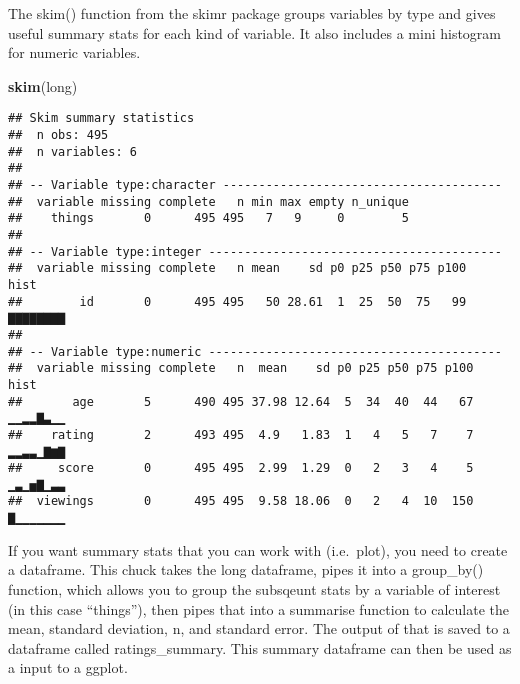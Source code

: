 \documentclass[]{article}
\newenvironment{Shaded}{\begin{snugshade}}{\end{snugshade}}
\newcommand{\DataTypeTok}[1]{\textcolor[rgb]{0.13,0.29,0.53}{#1}}
\newcommand{\KeywordTok}[1]{\textcolor[rgb]{0.13,0.29,0.53}{\textbf{#1}}}
\newcommand{\NormalTok}[1]{#1}
\newcommand{\OperatorTok}[1]{\textcolor[rgb]{0.81,0.36,0.00}{\textbf{#1}}}
\newcommand{\OtherTok}[1]{\textcolor[rgb]{0.56,0.35,0.01}{#1}}
\newcommand{\StringTok}[1]{\textcolor[rgb]{0.31,0.60,0.02}{#1}}
\begin{document}
The skim() function from the skimr package groups variables by type and
gives useful summary stats for each kind of variable. It also includes a
mini histogram for numeric variables.

\begin{Shaded}
\begin{Highlighting}[]
\KeywordTok{skim}\NormalTok{(long) }
\end{Highlighting}
\end{Shaded}

\begin{verbatim}
## Skim summary statistics
##  n obs: 495 
##  n variables: 6 
## 
## -- Variable type:character ---------------------------------------
##  variable missing complete   n min max empty n_unique
##    things       0      495 495   7   9     0        5
## 
## -- Variable type:integer -----------------------------------------
##  variable missing complete   n mean    sd p0 p25 p50 p75 p100     hist
##        id       0      495 495   50 28.61  1  25  50  75   99 ▇▇▇▇▇▇▇▇
## 
## -- Variable type:numeric -----------------------------------------
##  variable missing complete   n  mean    sd p0 p25 p50 p75 p100     hist
##       age       5      490 495 37.98 12.64  5  34  40  44   67 ▁▁▂▂▇▃▁▁
##    rating       2      493 495  4.9   1.83  1   4   5   7    7 ▂▂▃▃▁▇▆▇
##     score       0      495 495  2.99  1.29  0   2   3   4    5 ▁▃▁▅▇▁▃▃
##  viewings       0      495 495  9.58 18.06  0   2   4  10  150 ▇▁▁▁▁▁▁▁
\end{verbatim}

If you want summary stats that you can work with (i.e.~plot), you need
to create a dataframe. This chuck takes the long dataframe, pipes it
into a group\_by() function, which allows you to group the subsqeunt
stats by a variable of interest (in this case ``things''), then pipes
that into a summarise function to calculate the mean, standard
deviation, n, and standard error. The output of that is saved to a
dataframe called ratings\_summary. This summary dataframe can then be
used as a input to a ggplot.

\begin{Shaded}
\end{Shaded}
\end{document}
